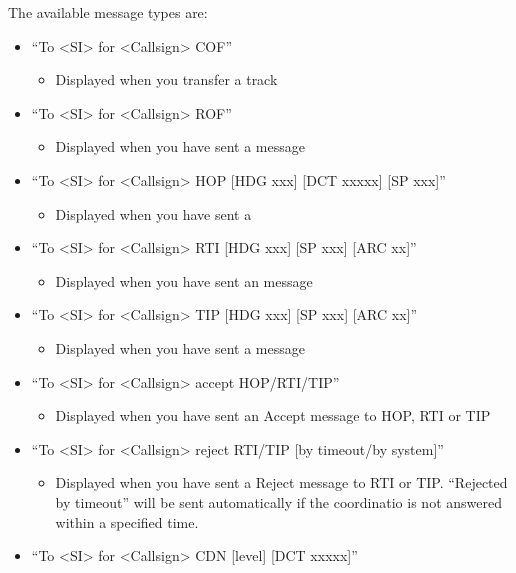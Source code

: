 \documentclass[a4paper,oneside,11pt]{memoir}
\begin{document}
\bigskip

The available message types are:

\begin{itemize}
  \item“To <SI> for <Callsign> COF”
    \begin{itemize}
      \item Displayed when you transfer a track
    \end{itemize}
  \item“To <SI> for <Callsign> ROF”
    \begin{itemize}
      \item Displayed when you have sent a  message
    \end{itemize}
  \item“To <SI> for <Callsign> HOP [HDG xxx] [DCT xxxxx] [SP xxx]”
    \begin{itemize}
      \item Displayed when you have sent a 
    \end{itemize}
  \item“To <SI> for <Callsign> RTI [HDG xxx] [SP xxx] [ARC xx]”
    \begin{itemize}
      \item Displayed when you have sent an  message
    \end{itemize}
  \item“To <SI> for <Callsign> TIP [HDG xxx] [SP xxx] [ARC xx]”
    \begin{itemize}
      \item Displayed when you have sent a  message
    \end{itemize}
  \item“To <SI> for <Callsign> accept HOP/RTI/TIP”
    \begin{itemize}
      \item Displayed when you have sent an Accept message to HOP, RTI or TIP
    \end{itemize}
  \item“To <SI> for <Callsign> reject RTI/TIP [by timeout/by system]”
    \begin{itemize}
      \item Displayed when you have sent a Reject message to RTI or TIP. “Rejected by timeout” will be sent automatically if the coordinatio is not answered within a specified time.
    \end{itemize}
  \item“To <SI> for <Callsign> CDN [level] [DCT xxxxx]”

\end{itemize}
\end{document}
